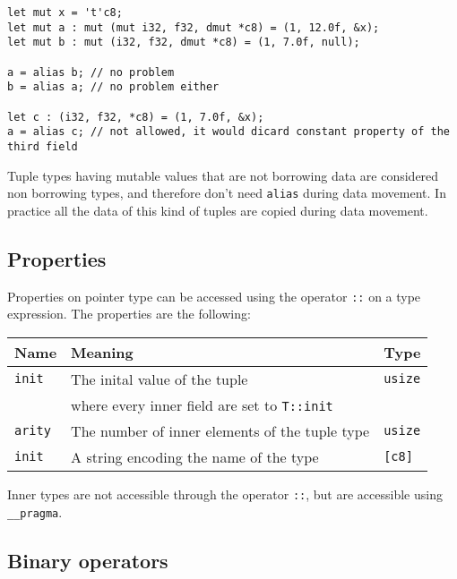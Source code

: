 \begin{lstlisting}[style=coloredverbatim]
let mut x = 't'c8;
let mut a : mut (mut i32, f32, dmut *c8) = (1, 12.0f, &x);
let mut b : mut (i32, f32, dmut *c8) = (1, 7.0f, null);

a = alias b; // no problem
b = alias a; // no problem either

let c : (i32, f32, *c8) = (1, 7.0f, &x);
a = alias c; // not allowed, it would dicard constant property of the third field
\end{lstlisting}

Tuple types having mutable values that are not borrowing data are considered non
borrowing types, and therefore don't need \texttt{alias} during data movement.
In practice all the data of this kind of tuples are copied during data movement.

\subsection {Properties}

Properties on pointer type can be accessed using the operator \texttt{::} on a
type expression. The properties are the following:
\smallskip

\begin{center}
  \begin{adjustbox}{max width=\linewidth}
    \begin{tabular}{|l|ll|}
      \hline
      Name & Meaning & Type\\
      \hline
      \hline
      \texttt{init} & The inital value of the tuple & \texttt{usize} \\
      & where every inner field are set to \texttt{T::init} & \\
      \Xhline{0.001pt}
      \texttt{arity} & The number of inner elements of the tuple type & \texttt{usize}\\
      \hline
      \texttt{init} & A string encoding the name of the type & \texttt{[c8]} \\
      \hline
    \end{tabular}
  \end{adjustbox}
\end{center}

\smallskip

Inner types are not accessible through the operator \texttt{::}, but are
accessible using \texttt{\_\_pragma}.

\subsection {Binary operators}


